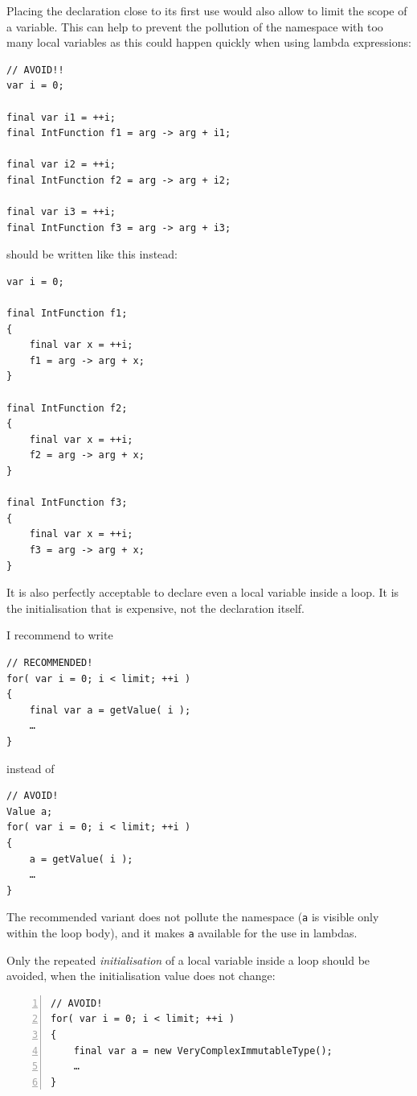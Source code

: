 Placing the declaration close to its first use would also allow to limit the scope of a variable. This can help to prevent the pollution of the namespace with too many local variables as this could happen quickly when using lambda expressions:
\begin{lstlisting}
// AVOID!!
var i = 0;

final var i1 = ++i;
final IntFunction f1 = arg -> arg + i1;

final var i2 = ++i;
final IntFunction f2 = arg -> arg + i2;

final var i3 = ++i;
final IntFunction f3 = arg -> arg + i3;
\end{lstlisting}

should be written like this instead:
\begin{lstlisting}
var i = 0;

final IntFunction f1;
{
    final var x = ++i;
    f1 = arg -> arg + x;
}

final IntFunction f2;
{
    final var x = ++i;
    f2 = arg -> arg + x;
}

final IntFunction f3;
{
    final var x = ++i;
    f3 = arg -> arg + x;
}
\end{lstlisting}

It is also perfectly acceptable to declare even a local variable inside a loop. It is the initialisation that is expensive, not the declaration itself. 

I recommend to write
\begin{lstlisting}
// RECOMMENDED!
for( var i = 0; i < limit; ++i )
{
    final var a = getValue( i );
    …
}
\end{lstlisting}
instead of
\begin{lstlisting}
// AVOID!
Value a;
for( var i = 0; i < limit; ++i )
{
    a = getValue( i );
    …
}
\end{lstlisting}
The recommended variant does not pollute the namespace (\lstinline|a| is visible only within the loop body), and  it makes \lstinline|a| available for the use in lambdas.
 
Only the repeated \textit{initialisation} of a local variable inside a loop should be avoided, when the initialisation value does not change:
\begin{lstlisting}[numbers=left]
// AVOID!
for( var i = 0; i < limit; ++i )
{
    final var a = new VeryComplexImmutableType();
    …
}
\end{lstlisting}


